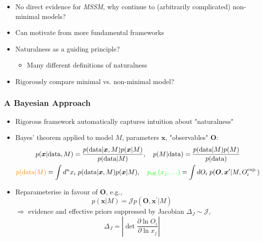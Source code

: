 \documentclass[10pt,aspectratio=169]{beamer}
\begin{document}
\begin{frame}
\begin{itemize}
  \item \alert{No direct evidence for \emph{MSSM}, why continue
    to (arbitrarily complicated) non-minimal models?}
  \item Can motivate from more fundamental frameworks
  \item Naturalness as a guiding principle?
    \begin{itemize}\itemsep0.5em
      \item Many different definitions of naturalness
    \end{itemize}
  \item {\color{blue} Rigorously compare minimal vs. non-minimal model?}
  \end{itemize}
\end{frame}

\begin{frame}
  \frametitle{A Bayesian Approach}
  \begin{itemize}\itemsep1em
    \item Rigorous framework {\color{blue} automatically captures intuition
      about "naturalness"}
    \item Bayes' theorem applied to model $M$, parameters $\bm{x}$,
      "observables" $\bm{O}$:
      \begin{gather*}
        p(\bm{x}|\text{data},M) = \frac{p(\text{data}|\bm{x},M) p(\bm{x}|M)}
        {p(\text{data}|M)} , \quad
        p(M|\text{data}) = \frac{p(\text{data}|M) p(M)}{p(\text{data})} \\
        {\color{orange} p(\text{data}|M)}
      = \int d^n x_i\; p(\text{data}|
        \bm{x},M) p(\bm{x}|M), \quad
        {\color{green} p_{\text{eff.}}(x_j,\ldots)} = \int dO_i \;
          p(\bm{O}, \bm{x}^\prime | M, O_i^{\text{exp.}})
      \end{gather*}
    \item Reparameterise in favour of $\bm{O}$, e.g.,
      \begin{equation*}
        p(\bm{x}|M) = \mathcal{J} p(\bm{O},\bm{x}^\prime|M)
      \end{equation*}
      $\Rightarrow$ {\color{orange} evidence} and {\color{green}
      effective priors} {\color{blue} suppressed by Jacobian} $\Delta_J
      \sim \mathcal{J}$,
      \begin{equation*}
        \Delta_J = \left | \det \frac{\partial \ln O_i}{\partial \ln x_j}
        \right |
      \end{equation*}
 \end{itemize}
\end{frame}
\end{document}
